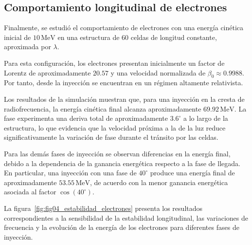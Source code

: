 \subsection{Comportamiento longitudinal de electrones}

Finalmente, se estudió el comportamiento de electrones con una energía cinética inicial de $10\,\mathrm{MeV}$ en una estructura de 60 celdas de longitud constante, aproximada por $\lambda$.

Para esta configuración, los electrones presentan inicialmente un factor de Lorentz de aproximadamente $20.57$ y una velocidad normalizada de $\beta_0\approx0.9988$. Por tanto, desde la inyección se encuentran en un régimen altamente relativista.

Los resultados de la simulación muestran que, para una inyección en la cresta de radiofrecuencia, la energía cinética final alcanza aproximadamente $69.92\,\mathrm{MeV}$. La fase experimenta una deriva total de aproximadamente $3.6^\circ$ a lo largo de la estructura, lo que evidencia que la velocidad próxima a la de la luz reduce significativamente la variación de fase durante el tránsito por las celdas.

Para las demás fases de inyección se observan diferencias en la energía final, debido a la dependencia de la ganancia energética respecto a la fase de llegada. En particular, una inyección con una fase de $40^\circ$ produce una energía final de aproximadamente $53.55\,\mathrm{MeV}$, de acuerdo con la menor ganancia energética asociada al factor $\cos(40^\circ)$.

La figura~\ref{fig:fig04_estabilidad_electrones} presenta los resultados correspondientes a la sensibilidad de la estabilidad longitudinal, las variaciones de frecuencia y la evolución de la energía de los electrones para diferentes fases de inyección.
